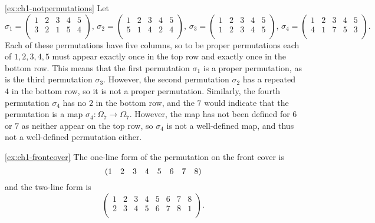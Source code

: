 \begin{solution}{\ref{ex:ch1-notpermutations}}{
    Let
    \[
    \sigma_{1} = \begin{pmatrix}
        1 & 2 & 3 & 4 & 5 \\
        3 & 2 & 1 & 5 & 4 \\
    \end{pmatrix},\, \sigma_{2} = \begin{pmatrix}
        1 & 2 & 3 & 4 & 5 \\
        5 & 1 & 4 & 2 & 4 \\
    \end{pmatrix},\, \sigma_{3} = \begin{pmatrix}
        1 & 2 & 3 & 4 & 5 \\
        1 & 2 & 3 & 4 & 5 \\
    \end{pmatrix},\, \sigma_{4} = \begin{pmatrix}
        1 & 2 & 3 & 4 & 5 \\
        4 & 1 & 7 & 5 & 3 \\
    \end{pmatrix}.
    \]
    Each of these permutations have five columns, so to be proper permutations each of \(1, 2, 3, 4, 5\) must appear exactly once in the top row and exactly once in the bottom row. This means that the first permutation \(\sigma_{1}\) is a proper permutation, as is the third permutation \(\sigma_{3}\). However, the second permutation \(\sigma_{2}\) has a repeated \(4\) in the bottom row, so it is not a proper permutation. Similarly, the fourth permutation \(\sigma_{4}\) has no \(2\) in the bottom row, and the \(7\) would indicate that the permutation is a map \(\sigma_{4} \colon \Omega_{7} \to \Omega_{7}\). However, the map has not been defined for \(6\) or \(7\) as neither appear on the top row, so \(\sigma_{4}\) is not a well-defined map, and thus not a well-defined permutation either.
}\end{solution}

\begin{solution}{\ref{ex:ch1-frontcover}}{
    The one-line form of the permutation on the front cover is
    \[
    (1 \quad 2 \quad 3 \quad 4 \quad 5 \quad 6 \quad 7 \quad 8)
    \]
    and the two-line form is
    \[
    \begin{pmatrix}
        1 & 2 & 3 & 4 & 5 & 6 & 7 & 8\\
        2 & 3 & 4 & 5 & 6 & 7 & 8 & 1\\
    \end{pmatrix}.
    \]
}\end{solution}

